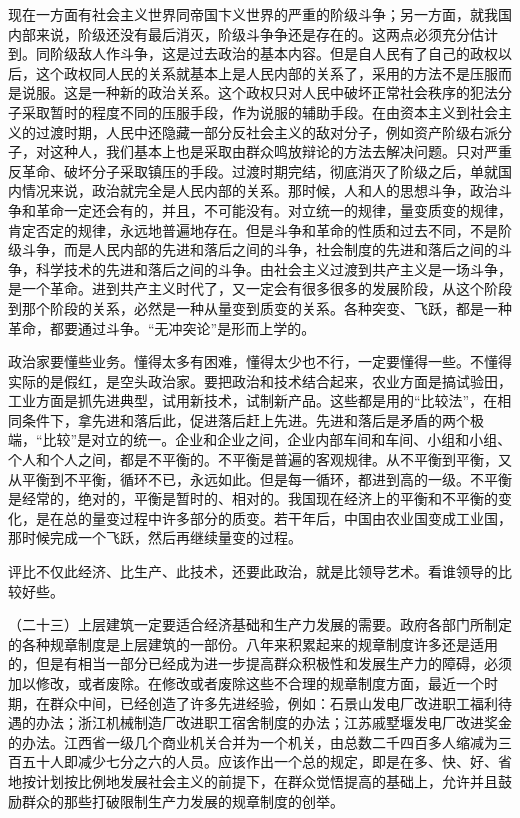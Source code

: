 现在一方面有社会主义世界同帝国卞义世界的严重的阶级斗争；另一方面，就我国内部来说，阶级还没有最后消灭，阶级斗争争还是存在的。这两点必须充分估计到。同阶级敌人作斗争，这是过去政治的基本内容。但是自人民有了自己的政权以后，这个政权同人民的关系就基本上是人民内部的关系了，采用的方法不是压服而是说服。这是一种新的政治关系。这个政权只对人民中破坏正常社会秩序的犯法分子采取暂时的程度不同的压服手段，作为说服的辅助手段。在由资本主义到社会主义的过渡时期，人民中还隐藏一部分反社会主义的敌对分子，例如资产阶级右派分子，对这种人，我们基本上也是采取由群众鸣放辩论的方法去解决问题。只对严重反革命、破坏分子采取镇压的手段。过渡时期完结，彻底消灭了阶级之后，单就国内情况来说，政治就完全是人民内部的关系。那时候，人和人的思想斗争，政治斗争和革命一定还会有的，并且，不可能没有。对立统一的规律，量变质变的规律，肯定否定的规律，永远地普遍地存在。但是斗争和革命的性质和过去不同，不是阶级斗争，而是人民内部的先进和落后之间的斗争，社会制度的先进和落后之间的斗争，科学技术的先进和落后之间的斗争。由社会主义过渡到共产主义是一场斗争，是一个革命。进到共产主义时代了，又一定会有很多很多的发展阶段，从这个阶段到那个阶段的关系，必然是一种从量变到质变的关系。各种突变、飞跃，都是一种革命，都要通过斗争。“无冲突论”是形而上学的。

政治家要懂些业务。懂得太多有困难，懂得太少也不行，一定要懂得一些。不懂得实际的是假红，是空头政治家。要把政治和技术结合起来，农业方面是搞试验田，工业方面是抓先进典型，试用新技术，试制新产品。这些都是用的“比较法”，在相同条件下，拿先进和落后此，促进落后赶上先进。先进和落后是矛盾的两个极端，“比较”是对立的统一。企业和企业之间，企业内部车间和车间、小组和小组、个人和个人之间，都是不平衡的。不平衡是普遍的客观规律。从不平衡到平衡，又从平衡到不平衡，循环不已，永远如此。但是每一循环，都进到高的一级。不平衡是经常的，绝对的，平衡是暂时的、相对的。我国现在经济上的平衡和不平衡的变化，是在总的量变过程中许多部分的质变。若干年后，中国由农业国变成工业国，那时候完成一个飞跃，然后再继续量变的过程。

评比不仅此经济、比生产、此技术，还要此政治，就是比领导艺术。看谁领导的比较好些。

（二十三）上层建筑一定要适合经济基础和生产力发展的需要。政府各部门所制定的各种规章制度是上层建筑的一部份。八年来积累起来的规章制度许多还是适用的，但是有相当一部分已经成为进一步提高群众积极性和发展生产力的障碍，必须加以修改，或者废除。在修改或者废除这些不合理的规章制度方面，最近一个时期，在群众中间，已经创造了许多先进经验，例如：石景山发电厂改进职工福利待遇的办法；浙江机械制造厂改进职工宿舍制度的办法；江苏戚墅堰发电厂改进奖金的办法。江西省一级几个商业机关合并为一个机关，由总数二千四百多人缩减为三百五十人即减少七分之六的人员。应该作出一个总的规定，即是在多、快、好、省地按计划按比例地发展社会主义的前提下，在群众觉悟提高的基础上，允许并且鼓励群众的那些打破限制生产力发展的规章制度的创举。

